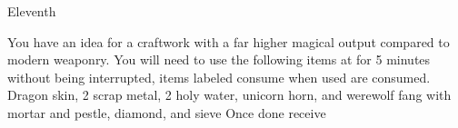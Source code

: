 \documentclass[greennotebook]{guildcamp3} %
\begin{document}
\begin{page}{Eleventh}
	
	You have an idea for a craftwork with a far higher magical output compared to modern weaponry.
	You will need to use the following items at \sMageWorkbench{} for 5 minutes without being interrupted, items labeled consume when used are consumed.
	Dragon skin, 2 scrap metal, 2 holy water, unicorn horn, and werewolf fang with mortar and pestle, diamond, and sieve
	Once done receive \iUpgradedMagicGun{}
	
\end{page}




\endnotebook
\end{document}
